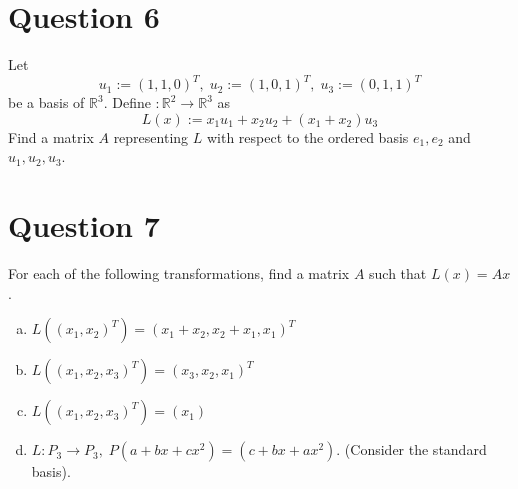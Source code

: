 \documentclass{article}
\begin{document}
\section*{Question 6}
Let
$$
u_1 := (1, 1, 0)^T, \; u_2 := (1, 0, 1)^T, \; u_3 := (0, 1, 1)^T
$$
be a basis of $\mathbb{R}^3$. Define $: \mathbb{R}^2 \rightarrow \mathbb{R}^3$ as
$$ L(x) := x_1u_1 + x_2u_2 + (x_1 + x_2)u_3 $$
Find a matrix $A$ representing $L$ with respect to the ordered basis $e_1, e_2$ and $u_1, u_2, u_3$.

\section*{Question 7}
For each of the following transformations, find a matrix $A$ such that $L(x) = Ax$.
\begin{enumerate}[a.]
    \item $L((x_1, x_2)^T) = (x_1 + x_2, x_2 + x_1, x_1)^T$
    \item $L((x_1, x_2, x_3)^T) = (x_3, x_2, x_1)^T$
    \item $L((x_1, x_2, x_3)^T) = (x_1)$
    \item $L : P_3 \rightarrow P_3, \; P(a + bx + cx^2) = (c + bx + ax^2)$. (Consider the standard basis).
\end{enumerate}
\end{document}
